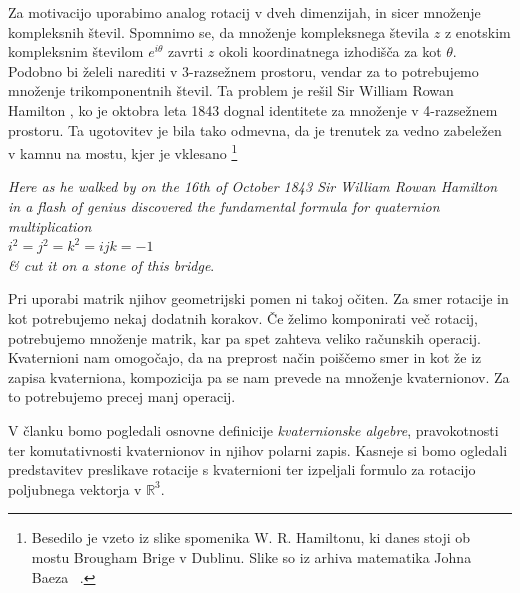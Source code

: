 \documentclass[a4paper,12pt]{article}
\def\R{\mathbb{R}} %
\begin{document}
Za motivacijo uporabimo analog rotacij v dveh dimenzijah, in sicer množenje kompleksnih števil.
Spomnimo se, da množenje kompleksnega števila $z$ z enotskim kompleksnim številom $e^{i\theta}$ zavrti $z$ okoli koordinatnega izhodišča za kot $\theta$.
Podobno bi želeli narediti v 3-razsežnem prostoru, vendar za to potrebujemo množenje trikomponentnih števil.
Ta problem je rešil Sir William Rowan Hamilton \cite{shoemake1985animating}, ko je oktobra leta 1843 dognal identitete za množenje v 4-razsežnem prostoru.
Ta ugotovitev je bila tako odmevna, da je trenutek za vedno zabeležen v kamnu na mostu, kjer je vklesano \footnote[1]{Besedilo je vzeto iz slike spomenika W. R. Hamiltonu, ki danes stoji ob mostu Brougham Brige v Dublinu. Slike so iz arhiva matematika Johna Baeza ~\cite{baez2004baezstuff}.}
\begin{center}
   \emph{ Here as he walked by
   on the 16th of October 1843
   Sir William Rowan Hamilton
   in a flash of genius discovered
   the fundamental formula for
   quaternion multiplication}\\
   $i^2 = j^2 = k^2 = ijk = -1$\\
   \emph{ \& cut it on a stone of this bridge}.
\end{center}


Pri uporabi matrik njihov geometrijski pomen ni takoj očiten. Za smer rotacije in kot potrebujemo nekaj dodatnih korakov. Če želimo komponirati več rotacij, potrebujemo množenje matrik, kar pa spet zahteva veliko računskih operacij.
Kvaternioni nam omogočajo, da na preprost način poiščemo smer in kot že iz zapisa kvaterniona, kompozicija pa se nam prevede na množenje kvaternionov. Za to potrebujemo precej manj operacij.

V članku bomo pogledali osnovne definicije \emph{kvaternionske algebre}, pravokotnosti ter komutativnosti kvaternionov in njihov polarni zapis.
Kasneje si bomo ogledali predstavitev preslikave rotacije s kvaternioni ter izpeljali formulo za rotacijo poljubnega vektorja v $\R^3$.

\newpage
\end{document}
